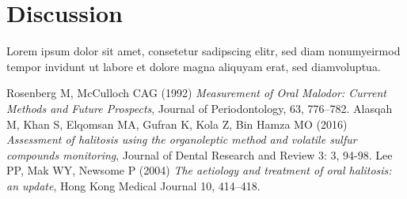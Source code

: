 \documentclass[12pt,a4paper,notitlepage]{report}
\begin{document}
\chapter{Discussion}
Lorem ipsum dolor sit amet, consetetur sadipscing elitr, sed diam nonumyeirmod tempor invidunt ut labore et dolore magna aliquyam erat, sed diamvoluptua. 



\begin{thebibliography}{9}
 Rosenberg M, McCulloch CAG (1992) \emph{Measurement of Oral Malodor: Current Methods and Future Prospects}, Journal of Periodontology, 63, 776–782.
 Alasqah M, Khan S, Elqomsan MA, Gufran K, Kola Z, Bin Hamza MO (2016) \emph{Assessment of halitosis using the organoleptic method and volatile sulfur compounds monitoring}, Journal of Dental Research and Review 3: 3, 94-98.
 Lee PP, Mak WY, Newsome P (2004) \emph{The aetiology and treatment of oral halitosis: an update}, Hong Kong Medical Journal  10, 414–418.


\bibitem[4]{ }   \emph{ }
\end{thebibliography}
\end{document}
